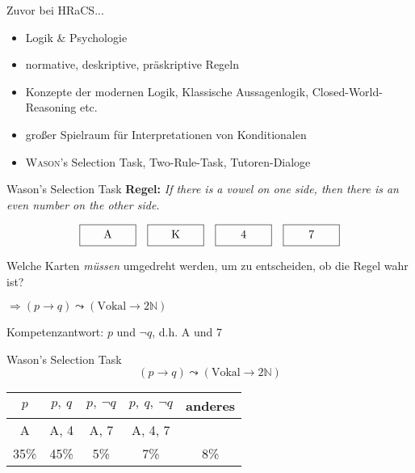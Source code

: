 
\begin{frame}{Zuvor bei HRaCS...}
    \begin{itemize}
        \item Logik \& Psychologie
        \item normative, deskriptive, präskriptive Regeln
        \pause
        
        \item Konzepte der modernen Logik, Klassische Aussagenlogik, Closed-World-Reasoning etc.
        \item großer Spielraum für Interpretationen von Konditionalen
        \pause

        \item \textsc{Wason}'s Selection Task, Two-Rule-Task, Tutoren-Dialoge
    \end{itemize}
\end{frame}


\begin{frame}{Wason's Selection Task {\scriptsize \cite[S.~44-46]{stenningHumanReasoningCognitive2008}}}
    \textbf{Regel:} \emph{If there is a vowel on one side, then there is an even number on the other side.}

    \[
        \framebox[5em][c]{A\strut}\quad
        \framebox[5em][c]{K\strut}\quad
        \framebox[5em][c]{4\strut}\quad
        \framebox[5em][c]{7\strut}
    \]

    Welche Karten \emph{müssen} umgedreht werden, um zu entscheiden, ob die Regel wahr ist?

    $\Rightarrow (p \to q) \leadsto (\text{Vokal} \to 2\mathbb{N})$

    Kompetenzantwort: $p$ und $\lnot q$, d.h. A und 7
\end{frame}


\begin{frame}{Wason's Selection Task {\scriptsize \cite[S.~44-46]{stenningHumanReasoningCognitive2008}}}
    $$(p \to q) \leadsto (\text{Vokal} \to 2\mathbb{N})$$

    \begin{center}
        \begin{tabular}{c | c | c | c | c}
            $p$ &$p,~q$ &\alert{$p, ~\lnot q$} &$p, ~q, ~\lnot q$ &anderes \\
            \hline
            A &A, 4 &\alert{A, 7} &A, 4, 7 & \\
            \hline \hline
            35\% &45\% &\alert{5\%} &7\% &8\%
        \end{tabular}
    \end{center}
\end{frame}



